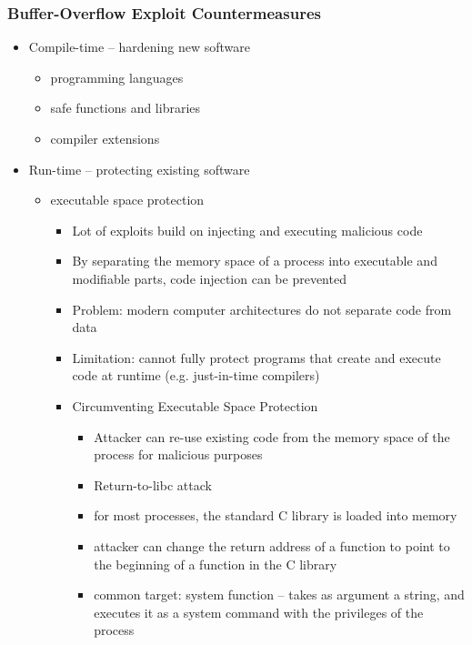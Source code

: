 \documentclass[final]{article}
\begin{document}
\subsubsection*{Buffer-Overflow Exploit Countermeasures}
\begin{itemize}
    \item Compile-time -- hardening new software
          \begin{itemize}[nosep]
              \item programming languages
              \item safe functions and libraries
              \item compiler extensions
          \end{itemize}
    \item Run-time -- protecting existing software
          \begin{itemize}[nosep]
              \item executable space protection
                    \begin{itemize}[nosep]
                        \item Lot of exploits build on injecting and executing malicious code
                        \item By separating the memory space of a process into executable and modifiable parts, code injection can be prevented
                        \item Problem: modern computer architectures do not separate code from data
                        \item Limitation: cannot fully protect programs that create and execute code at runtime (e.g. just-in-time compilers)
                        \item Circumventing Executable Space Protection
                              \begin{itemize}[nosep]
                                  \item Attacker can re-use existing code from the memory space of the process for malicious purposes
                                  \item Return-to-libc attack
                                  \item for most processes, the standard C library is loaded into memory
                                  \item attacker can change the return address of a function to point to the beginning of a function in the C library
                                  \item common target: system function -- takes as argument a string, and executes it as a system command with the privileges of the process

\end{itemize}
\end{itemize}
\end{itemize}
\end{itemize}
\end{document}
